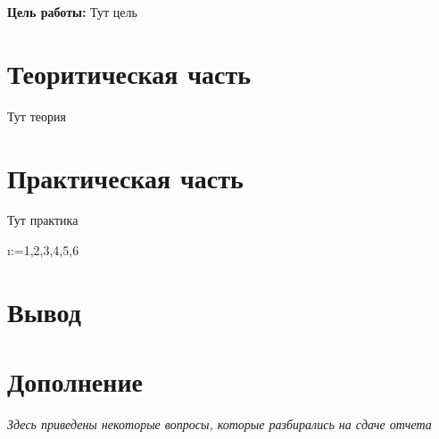 



\def\labauthors{Понур К.А., Хавьер, Шиков А.П.}
\def\labgroup{450}
\def\labnumber{1}
\def\labtheme{Согласованные фильтры}


\newpage

{\bfseries Цель работы:} 
Тут цель

\section{Теоритическая часть}

Тут теория


\newpage
\section{Практическая часть}
Тут практика

\makeatletter
\@for\i:={1,2,3,4,5,6}\do{}
\makeatother



\section{Вывод}


\newpage
\section{Дополнение}
\textit{Здесь приведены некоторые вопросы, которые разбирались на сдаче отчета}


